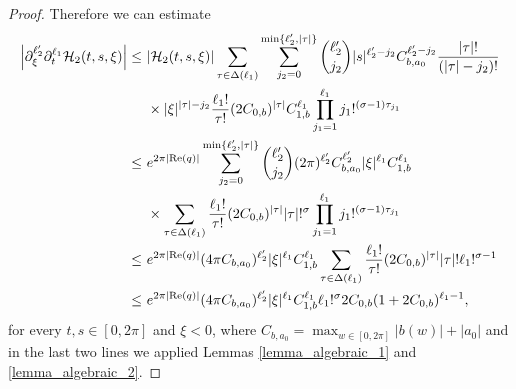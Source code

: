 \documentclass[11pt,reqno]{amsart}
\numberwithin{equation}{section}
\theoremstyle{definition}
\theoremstyle{definition}
\newcommand{\Real}{\mathrm{Re}}
\begin{document}
\begin{proof}
Therefore we can estimate
\begin{align}
    \left|\partial_\xi^{\ell_2'}\partial_t^{\ell_1}\mathcal{H}_2(t,s,\xi)\right| \leq &\   |\mathcal{H}_2(t,s,\xi)|\sum_{\tau\in\Delta(\ell_1)}\sum_{j_2=0}^{\min\{\ell_2',|\tau|\}}\binom{\ell_2'}{j_2}|s|^{\ell_2'-j_2}C_{b,a_0}^{\ell_2'-j_2}\frac{|\tau|!}{(|\tau|-j_2)!}\notag\\
    &\  \times |\xi|^{|\tau|-j_2}
    \frac{\ell_1!}{\tau!}(2C_{0,b})^{|\tau|}C_{1,b}^{\ell_1}\prod_{j_1=1}^{\ell_1}j_1!^{(\sigma-1)\tau_{j_1}}\notag\\
    \leq &\  e^{2\pi|\Real(q)|}\sum_{j_2=0}^{\min\{\ell_2',|\tau|\}}\binom{\ell_2'}{j_2}(2\pi)^{\ell_2'}C_{b,a_0}^{\ell_2'}|\xi|^{\ell_1}C_{1,b}^{\ell_1}\notag\\
    &\ \times\sum_{\tau\in\Delta(\ell_1)} 
    \frac{\ell_1!}{\tau!}(2C_{0,b})^{|\tau|}|\tau|!^\sigma\prod_{j_1=1}^{\ell_1}j_1!^{(\sigma-1)\tau_{j_1}}\notag\\
        \leq &\ e^{2\pi|\Real(q)|}(4\pi C_{b,a_0})^{\ell_2'}|\xi|^{\ell_1}C_{1,b}^{\ell_1}\sum_{\tau\in\Delta(\ell_1)} 
    \frac{\ell_1!}{\tau!}(2C_{0,b})^{|\tau|}|\tau|!\ell_1!^{\sigma-1}\notag\\
    \leq &\ e^{2\pi|\Real(q)|}(4\pi C_{b,a_0})^{\ell_2'}|\xi|^{\ell_1}C_{1,b}^{\ell_1}\ell_1!^\sigma 2C_{0,b}(1+2C_{0,b})^{\ell_1-1},\label{H2}
\end{align}
for every $t,s\in[0,2\pi]$ and $\xi<0$, where $C_{b,a_0} = \displaystyle\max_{w\in[0,2\pi]} |b(w)| + |a_0|$ and in the last two lines we applied Lemmas \ref{lemma_algebraic_1} and \ref{lemma_algebraic_2}.


\end{proof}
\end{document}
